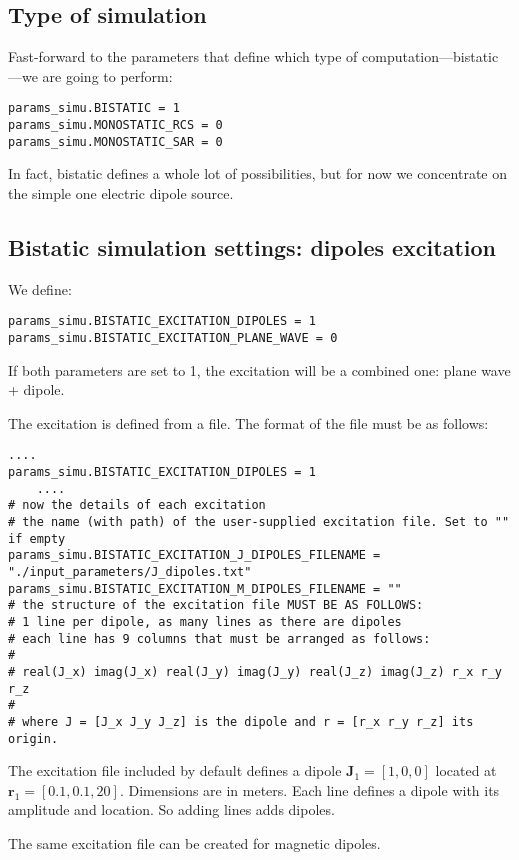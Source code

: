 \documentclass[a4paper,10pt]{book}
\begin{document}
\subsection{Type of simulation}
%
\par
Fast-forward to the parameters that define which type of computation---bistatic---we are going to perform:
\begin{verbatim}
params_simu.BISTATIC = 1
params_simu.MONOSTATIC_RCS = 0
params_simu.MONOSTATIC_SAR = 0
\end{verbatim}
In fact, bistatic defines a whole lot of possibilities, but for now we concentrate on the simple one electric dipole source.

\subsection{Bistatic simulation settings: dipoles excitation}
%
\par
We define:
\begin{verbatim}
params_simu.BISTATIC_EXCITATION_DIPOLES = 1
params_simu.BISTATIC_EXCITATION_PLANE_WAVE = 0
\end{verbatim}
If both parameters are set to 1, the excitation will be a combined one: plane wave + dipole.
%
\par
The excitation is defined from a file. The format of the file must be as follows:
\begin{verbatim}
....
params_simu.BISTATIC_EXCITATION_DIPOLES = 1
    ....
# now the details of each excitation
# the name (with path) of the user-supplied excitation file. Set to "" if empty
params_simu.BISTATIC_EXCITATION_J_DIPOLES_FILENAME = "./input_parameters/J_dipoles.txt"
params_simu.BISTATIC_EXCITATION_M_DIPOLES_FILENAME = ""
# the structure of the excitation file MUST BE AS FOLLOWS:
# 1 line per dipole, as many lines as there are dipoles
# each line has 9 columns that must be arranged as follows:
#
# real(J_x) imag(J_x) real(J_y) imag(J_y) real(J_z) imag(J_z) r_x r_y r_z
#
# where J = [J_x J_y J_z] is the dipole and r = [r_x r_y r_z] its origin.
\end{verbatim}
The excitation file included by default defines a dipole $\mathbf{J}_1 = [1, 0, 0]$ located at $\mathbf{r}_1 = [0.1, 0.1, 20]$. Dimensions are in meters. Each line defines a dipole with its amplitude and location. So adding lines adds dipoles.
%
\par
The same excitation file can be created for magnetic dipoles.
\end{document}
